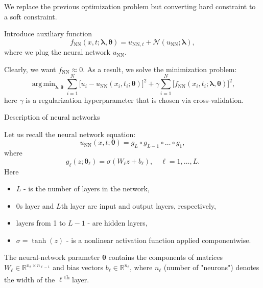 \documentclass{beamer}
\renewcommand{\vec}[1]{\boldsymbol{#1}}
\newcommand{\VTheta}{\ensuremath{\vec{\theta}}}
\newcommand{\VLambda}{\ensuremath{\vec{\lambda}}}
\DeclareMathOperator*{\argmin}{arg\,min}
\newcommand{\R}{\mathbb R}
\newcommand{\UNN}[1][\text{NN}]{u_{#1}}
\newcommand{\FNN}[1][\text{NN}]{f_{#1}}
\newcommand{\NonlinOp}{\mathcal N\!}
\begin{document}
\begin{frame}
We replace the previous optimization problem but converting hard constraint
to a soft constraint.

Introduce auxiliary function
\begin{equation*}
    \FNN(x, t; \VLambda, \VTheta) =
        u_{\text{NN}, t} + \NonlinOp(u_{\text{NN}}; \VLambda),
\end{equation*}
where we plug the neural network $\UNN$.

\vspace{0.5cm}
Clearly, we want $\FNN \approx 0$.
As a result, we solve the minimization problem:
\begin{equation*}
    \argmin_{\VLambda, \VTheta}
    \sum_{i=1}^N \big[ u_i - \UNN(x_i, t_i; \VTheta)\big ]^2
    +\gamma \sum_{i=1}^N \big[ \FNN(x_i, t_i; \VLambda, \VTheta) \big]^2,
\end{equation*}
here $\gamma$ is a regularization hyperparameter that is chosen via cross-validation.
    
\end{frame}

\begin{frame}{Description of neural networks}
    
Let us recall the neural network equation:
$$
\UNN(x, t; \vec{\theta}) = g_L \circ g_{L-1} \circ \dots \circ g_1,
$$
where
\[
    g_\ell(z; \VTheta_\ell) = \sigma (W_\ell z + b_\ell), \quad \ell = 1,\dots,L.
\]
Here 
\begin{itemize}
    \item $L$  - is the number of layers in the network,
    \item 0s layer and $L$th layer are input and output layers, respectively,
    \item layers from 1 to $L-1$ - are hidden layers,
    \item $\sigma = \tanh (z) $ - is a nonlinear activation function applied componentwise.
\end{itemize} 
 
The neural-network parameter $\VTheta$ contains the components of matrices
$W_\ell \in \R^{n_{\ell}\times n_{\ell-1}}$ and bias vectors
$b_\ell \in \R^{n_\ell}$, where $n_\ell$  (number of "neurons") denotes the width of the
$\ell$\textsuperscript{th} layer.
    
\end{frame}
\end{document}
